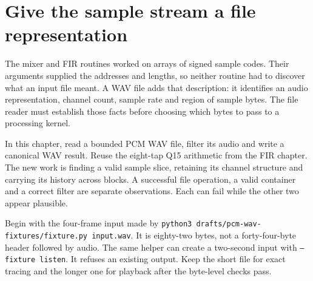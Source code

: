 \section{Give the sample stream a file representation}
The mixer and FIR routines worked on arrays of signed sample codes. Their arguments
supplied the addresses and lengths, so neither routine had to discover what an input
file meant. A WAV file adds that description: it identifies an audio representation,
channel count, sample rate and region of sample bytes. The file reader must establish
those facts before choosing which bytes to pass to a processing kernel.

In this chapter, read a bounded PCM WAV file, filter its audio and write a canonical
WAV result. Reuse the eight-tap Q15 arithmetic from the FIR chapter. The new work is
finding a valid sample slice, retaining its channel structure and carrying its history
across blocks. A successful file operation, a valid container and a correct filter are
separate observations. Each can fail while the other two appear plausible.

Begin with the four-frame input made by
\texttt{python3 drafts/pcm-wav-fixtures/fixture.py input.wav}. It is eighty-two bytes,
not a forty-four-byte header followed by audio. The same helper can create a two-second
input with \texttt{--fixture listen}. It refuses an existing output. Keep the short file
for exact tracing and the longer one for playback after the byte-level checks pass.

